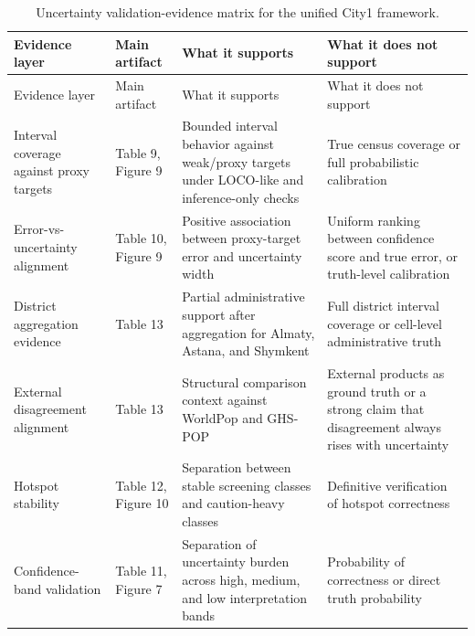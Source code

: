 \begin{longtable}{L{2.7cm}L{3.2cm}L{4.3cm}L{4.3cm}}
\caption{Uncertainty validation-evidence matrix for the unified City1 framework.}\label{tab:s2-uncertainty-evidence}\\
\toprule
Evidence layer & Main artifact & What it supports & What it does not support \\
\midrule
\endfirsthead
\toprule
Evidence layer & Main artifact & What it supports & What it does not support \\
\midrule
\endhead
Interval coverage against proxy targets & Table 9, Figure 9 & Bounded interval behavior against weak/proxy targets under LOCO-like and inference-only checks & True census coverage or full probabilistic calibration \\
Error-vs-uncertainty alignment & Table 10, Figure 9 & Positive association between proxy-target error and uncertainty width & Uniform ranking between confidence score and true error, or truth-level calibration \\
District aggregation evidence & Table 13 & Partial administrative support after aggregation for Almaty, Astana, and Shymkent & Full district interval coverage or cell-level administrative truth \\
External disagreement alignment & Table 13 & Structural comparison context against WorldPop and GHS-POP & External products as ground truth or a strong claim that disagreement always rises with uncertainty \\
Hotspot stability & Table 12, Figure 10 & Separation between stable screening classes and caution-heavy classes & Definitive verification of hotspot correctness \\
Confidence-band validation & Table 11, Figure 7 & Separation of uncertainty burden across high, medium, and low interpretation bands & Probability of correctness or direct truth probability \\
\bottomrule
\end{longtable}

